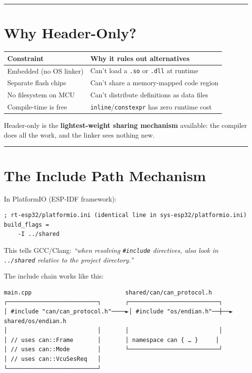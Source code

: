 \documentclass[12pt,a4paper,oneside]{report}
\begin{document}
\begin{center}\rule{0.5\linewidth}{0.5pt}\end{center}

\section{Why Header-Only?}\label{why-header-only}

\begin{longtable}[]{@{}ll@{}}
\toprule\noalign{}
Constraint & Why it rules out alternatives \\
\midrule\noalign{}
\endhead
\bottomrule\noalign{}
\endlastfoot
Embedded (no OS linker) & Can't load a \texttt{.so} or \texttt{.dll} at
runtime \\
Separate flash chips & Can't share a memory-mapped code region \\
No filesystem on MCU & Can't distribute definitions as data files \\
Compile-time is free & \texttt{inline}/\texttt{constexpr} has zero runtime
cost \\
\end{longtable}

Header-only is the \textbf{lightest-weight sharing mechanism} available: the
compiler does all the work, and the linker sees nothing new.

\begin{center}\rule{0.5\linewidth}{0.5pt}\end{center}

\section{The Include Path Mechanism}\label{the-include-path-mechanism}

In PlatformIO (ESP-IDF framework):

\begin{verbatim}
; rt-esp32/platformio.ini (identical line in sys-esp32/platformio.ini)
build_flags =
    -I ../shared
\end{verbatim}

This tells GCC/Clang: \emph{``when resolving \texttt{\#include} directives, also
look in \texttt{../shared} relative to the project directory.''}

The include chain works like this:

\begin{verbatim}
main.cpp                           shared/can/can_protocol.h
┌──────────────────────────┐       ┌──────────────────────────┐
│ #include "can/can_protocol.h"────►│ #include "os/endian.h"──┼──► shared/os/endian.h
│                          │       │                          │
│ // uses can::Frame       │       │ namespace can { … }     │
│ // uses can::Mode        │       └──────────────────────────┘
│ // uses can::VcuSesReq   │
└──────────────────────────┘
\end{verbatim}
\end{document}
